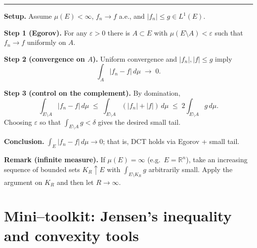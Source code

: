 \documentclass[12pt,a4paper]{article}
\theoremstyle{plain}
\theoremstyle{definition}
\theoremstyle{remark}
\theoremstyle{remark}
\newcommand{\tighthrule}{\vspace{0.6\baselineskip}\hrule\vspace{0.8\baselineskip}}
\newenvironment{spacy}{\begingroup\setlength{\parskip}{6pt}\setlength{\parindent}{0pt}}{\endgroup}
\theoremstyle{definition}
\begin{document}
\tighthrule
\begin{spacy}
	\textbf{Setup.}
	Assume $\mu(E)<\infty$, $f_n\to f$ a.e., and $|f_n|\le g\in L^1(E)$.
	
	\textbf{Step 1 (Egorov).}
	For any $\varepsilon>0$ there is $A\subset E$ with $\mu(E\setminus A)<\varepsilon$ such that
	$f_n\to f$ uniformly on $A$.
	
	\textbf{Step 2 (convergence on $A$).}
	Uniform convergence and $|f_n|,|f|\le g$ imply
	\[
	\int_{A} |f_n-f|\,d\mu \;\longrightarrow\; 0.
	\]
	
	\textbf{Step 3 (control on the complement).}
	By domination,
	\[
	\int_{E\setminus A} |f_n-f|\,d\mu
	\;\le\; \int_{E\setminus A} (|f_n|+|f|)\,d\mu
	\;\le\; 2\int_{E\setminus A} g\,d\mu.
	\]
	Choosing $\varepsilon$ so that $\int_{E\setminus A} g<\delta$ gives the desired small tail.
	
	\textbf{Conclusion.}
	$\displaystyle \int_E |f_n-f|\,d\mu \to 0$; that is, DCT holds via Egorov + small tail.
	
	\medskip
	
	\textbf{Remark (infinite measure).}
	If $\mu(E)=\infty$ (e.g.\ $E=\mathbb R^n$), take an increasing sequence of bounded sets $K_R\uparrow E$ with
	$\int_{E\setminus K_R} g$ arbitrarily small. Apply the argument on $K_R$ and then let $R\to\infty$.
\end{spacy}

\section*{Mini–toolkit: Jensen's inequality and convexity tools}
\end{document}
